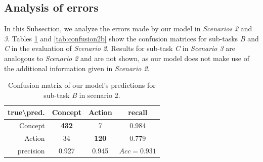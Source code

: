 \documentclass[a4paper,11pt,twocolumn,twoside]{article}
\begin{document}
\subsection{Analysis of errors}

In this Subsection, we analyze the errors made by our model in \emph{Scenarios} \emph{2} and \emph{3}. Tables \ref{tab:confusion2a} and \ref{tab:confusion2b} show the confusion matrices for sub-tasks \emph{B} and \emph{C} in the evaluation of \emph{Scenario 2}. Results for sub-task \emph{C} in \emph{Scenario 3} are analogous to \emph{Scenario 2} and are not shown, as our model does not make use of the additional information given in \emph{Scenario 2}.


\begin{table}[t]
 \small
    \centering
\begin{tabular}{r|cc|c}
\toprule
true\textbackslash pred. & Concept &  Action & recall \\
\midrule
Concept &  \textbf{432} &       7 &  0.984\\
Action  &   34 &     \textbf{120} & 0.779\\
\bottomrule
precision & 0.927 & 0.945 & $Acc=0.931$


\end{tabular}
    \caption{Confusion matrix of our model's predictions for sub-task \emph{B} in scenario 2.}
    \label{tab:confusion2a}
\end{table}
\end{document}

